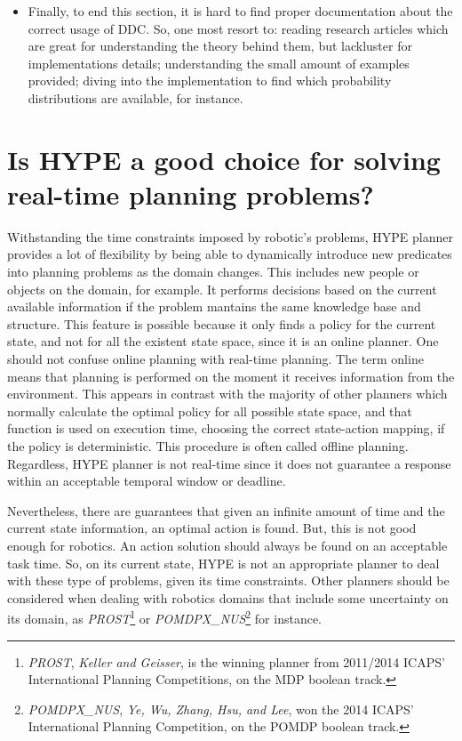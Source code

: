 \begin{itemize}
    \item Finally, to end this section, it is hard to find proper documentation
    about the correct usage of \gls{DDC}. So, one most resort to: reading
    research articles which are great for understanding the theory behind them,
    but lackluster for implementations details; understanding the small amount
    of examples provided; diving into the implementation to find which
    probability distributions are available, for instance.

\end{itemize}

\section{Is \gls{HYPE} a good choice for solving real-time planning
problems?}
Withstanding the time constraints imposed by robotic's problems, \gls{HYPE}
planner provides a lot of flexibility by being able to dynamically introduce new
predicates into planning problems as the domain changes. This includes new
people or objects on the domain, for example. It performs decisions
based on the current available information if the problem mantains the same
knowledge base and structure.
This feature is possible because it only finds a policy for the current
state, and not for all the existent state space, since it is an online planner.
One should not confuse online planning with real-time planning. The term online
means that planning is performed on the moment it receives information from
the environment.
This appears in contrast with the majority of other planners which normally
calculate the optimal policy for all possible state space, and that function
is used on execution time, choosing the correct state-action mapping, if the
policy is deterministic. This procedure is often called offline planning.
Regardless, \gls{HYPE} planner is not real-time since it does not guarantee a
response within an acceptable temporal window or deadline.

Nevertheless, there are guarantees that given an infinite amount of time and the
current state information, an optimal action is found. But, this is not good
enough for robotics. An action solution should always be found on an acceptable
task time. So, on its current state, \gls{HYPE} is not an appropriate planner
to deal with these type of problems, given its time constraints. Other planners
should be considered when dealing with robotics domains that include some
uncertainty on its domain, as \textit{PROST}\footnote{\textit{PROST}, \textit{
Keller and Geisser}, is the
winning planner from 2011/2014 ICAPS' International Planning Competitions, on
the MDP boolean track.} or \textit{POMDPX\_NUS}\footnote{\textit{POMDPX\_NUS},
\textit{Ye, Wu, Zhang, Hsu, and Lee}, won the 2014 ICAPS' International Planning
Competition, on the POMDP boolean track.} for instance.

